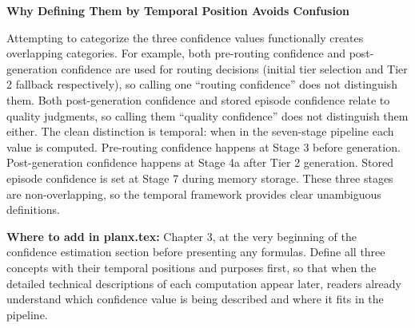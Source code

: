 \documentclass[11pt,a4paper]{article}
\begin{document}
{\textbf{Why Defining Them by Temporal Position Avoids Confusion}

Attempting to categorize the three confidence values functionally creates overlapping categories. For example, both pre-routing confidence and post-generation confidence are used for routing decisions (initial tier selection and Tier 2 fallback respectively), so calling one ``routing confidence'' does not distinguish them. Both post-generation confidence and stored episode confidence relate to quality judgments, so calling them ``quality confidence'' does not distinguish them either. The clean distinction is temporal: when in the seven-stage pipeline each value is computed. Pre-routing confidence happens at Stage 3 before generation. Post-generation confidence happens at Stage 4a after Tier 2 generation. Stored episode confidence is set at Stage 7 during memory storage. These three stages are non-overlapping, so the temporal framework provides clear unambiguous definitions.

\textbf{Where to add in planx.tex:} Chapter 3, at the very beginning of the confidence estimation section before presenting any formulas. Define all three concepts with their temporal positions and purposes first, so that when the detailed technical descriptions of each computation appear later, readers already understand which confidence value is being described and where it fits in the pipeline.
}
\end{document}
